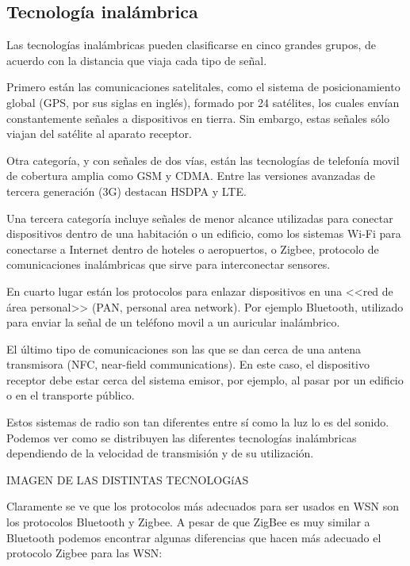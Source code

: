 \subsection{Tecnolog\'ia inal\'ambrica}
Las tecnolog\'ias inal\'ambricas pueden clasificarse en cinco grandes grupos, de acuerdo con la distancia que viaja cada
tipo de se\~nal.

Primero est\'an las comunicaciones satelitales, como el sistema de posicionamiento global (GPS, por sus siglas en ingl\'es),
formado por 24 sat\'elites, los cuales env\'ian constantemente se\~nales a dispositivos en tierra. Sin embargo, estas se\~nales
s\'olo viajan del sat\'elite al aparato receptor.

Otra categor\'ia, y con se\~nales de dos v\'ias, est\'an las tecnolog\'ias de telefon\'ia movil de cobertura amplia como GSM y CDMA.
Entre las versiones avanzadas de tercera generaci\'on (3G) destacan HSDPA y LTE.

Una tercera categor\'ia incluye se\~nales de menor alcance utilizadas para conectar dispositivos dentro de una habitaci\'on o
un edificio, como los sistemas Wi-Fi para conectarse a Internet dentro de hoteles o aeropuertos, o Zigbee, protocolo de
comunicaciones inal\'ambricas que sirve para interconectar sensores.

En cuarto lugar est\'an los protocolos para enlazar dispositivos en una <<red de \'area personal>>
(PAN, personal area network). Por ejemplo Bluetooth, utilizado para enviar la se\~nal de un tel\'efono movil a un auricular
inal\'ambrico. 

El \'ultimo tipo de comunicaciones son las que se dan cerca de una antena transmisora (NFC, near-field communications). En
este caso, el dispositivo receptor debe estar cerca del sistema emisor, por ejemplo, al pasar por un edificio o en el
transporte p\'ublico.

Estos sistemas de radio son tan diferentes entre s\'i como la luz lo es del sonido. Podemos ver como se distribuyen las
diferentes tecnolog\'ias inal\'ambricas dependiendo de la velocidad de transmisi\'on y de su utilizaci\'on.


 

IMAGEN DE LAS DISTINTAS TECNOLOG\'iAS


 

Claramente se ve que los protocolos m\'as adecuados para ser usados en WSN son los protocolos Bluetooth y Zigbee. A pesar
de que ZigBee es muy similar a Bluetooth podemos encontrar algunas diferencias que hacen m\'as adecuado el protocolo
Zigbee para las WSN: 

